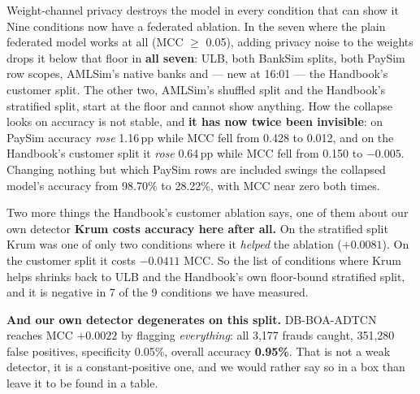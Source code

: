 \documentclass[11pt]{article}
\newcommand{\atleast}{\ensuremath{\ge}}
\begin{document}
\begin{keybox}{Weight-channel privacy destroys the model in every condition that can show it}
Nine conditions now have a federated ablation. In the seven where the plain federated model works at all
(MCC \atleast{} 0.05), adding privacy noise to the weights drops it below that floor in \textbf{all seven}:
ULB, both BankSim splits, both PaySim row scopes, AMLSim's native banks and --- new at 16:01 --- the
Handbook's customer split. The other two, AMLSim's shuffled split and the Handbook's stratified split,
start at the floor and cannot show anything. How the collapse looks on accuracy is not stable, and
\textbf{it has now twice been invisible}: on PaySim accuracy \emph{rose} 1.16\,pp while MCC fell from 0.428
to 0.012, and on the Handbook's customer split it \emph{rose} 0.64\,pp while MCC fell from 0.150 to
$-0.005$. Changing nothing but which PaySim rows are included swings the collapsed model's accuracy from
98.70\% to 28.22\%, with MCC near zero both times.
\end{keybox}

\begin{warnbox}{Two more things the Handbook's customer ablation says, one of them about our own detector}
\textbf{Krum costs accuracy here after all.} On the stratified split Krum was one of only two conditions
where it \emph{helped} the ablation ($+0.0081$). On the customer split it costs $-0.0411$ MCC. So the list
of conditions where Krum helps shrinks back to ULB and the Handbook's own floor-bound stratified split,
and it is negative in 7 of the 9 conditions we have measured.

\textbf{And our own detector degenerates on this split.} DB-BOA-ADTCN reaches MCC $+0.0022$ by flagging
\emph{everything}: all 3{,}177 frauds caught, 351{,}280 false positives, specificity 0.05\%, overall
accuracy \textbf{0.95\%}. That is not a weak detector, it is a constant-positive one, and we would rather
say so in a box than leave it to be found in a table.
\end{warnbox}
\end{document}
